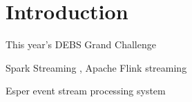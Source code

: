 
\section{Introduction}


This year's DEBS Grand Challenge \cite{debs2022challenge}









Spark Streaming \cite{zaharia2010spark}, Apache Flink streaming \cite{alexandrov2014stratosphere}

Esper event stream processing system \cite{Bernhardt2007}



